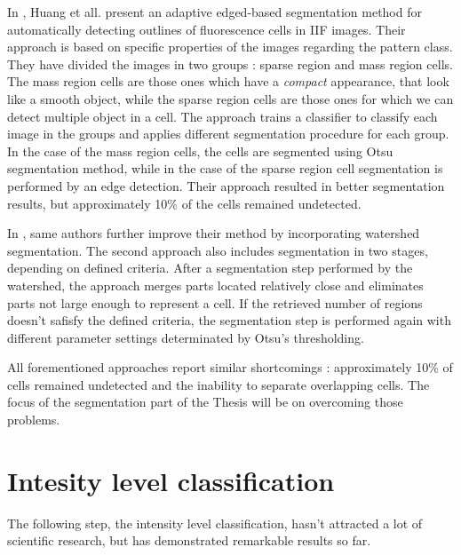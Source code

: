 In \cite{Huang2008}, Huang et all. present an adaptive edged-based segmentation method for automatically detecting outlines of fluorescence cells in IIF images. Their approach is based on specific properties of the images regarding the pattern class. They have divided the images in two groups : sparse region and mass region cells. The mass region cells are those ones which have a \textit{compact} appearance, that look like a smooth object, while the sparse region cells are those ones for which we can detect multiple object in a cell. The approach trains a classifier to classify each image in the groups and applies different segmentation procedure for each group. In the case of the mass region cells, the cells are segmented using Otsu segmentation method, while in the case of the sparse region cell segmentation is performed by an edge detection. Their approach resulted in better segmentation results, but approximately 10\% of the cells remained undetected.

In \cite{HuangWatershed}, same authors further improve their method by incorporating watershed segmentation. The second approach also includes segmentation in two stages, depending on defined criteria. After a segmentation step performed by the watershed, the approach merges parts located relatively close and eliminates parts not large enough to represent a cell. If the retrieved number of regions doesn't safisfy the defined criteria, the segmentation step is performed again with different parameter settings determinated by Otsu's thresholding. 

All forementioned approaches report similar shortcomings : approximately 10\% of cells remained undetected and the inability to separate overlapping cells.  The focus of the segmentation part of the Thesis will be on overcoming those problems.




\section{Intesity level classification}

The following step, the intensity level classification, hasn't attracted a lot of scientific research, but has demonstrated remarkable results so far.

